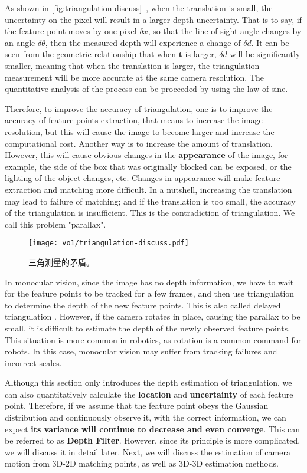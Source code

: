 As shown in \autoref{fig:triangulation-discuss}~, when the translation is small, the uncertainty on the pixel will result in a larger depth uncertainty. That is to say, if the feature point moves by one pixel $\delta x$, so that the line of sight angle changes by an angle $\delta \theta$, then the measured depth will experience a change of $\delta d$. It can be seen from the geometric relationship that when $\mathbf{t}$ is larger, $\delta d$ will be significantly smaller, meaning that when the translation is larger, the triangulation measurement will be more accurate at the same camera resolution. The quantitative analysis of the process can be proceeded by using the law of sine.

Therefore, to improve the accuracy of triangulation, one is to improve the accuracy of feature points extraction, that means to increase the image resolution, but this will cause the image to become larger and increase the computational cost. Another way is to increase the amount of translation. However, this will cause obvious changes in the \textbf{appearance} of the image, for example, the side of the box that was originally blocked can be exposed, or the lighting of the object changes, etc. Changes in appearance will make feature extraction and matching more difficult. In a nutshell, increasing the translation may lead to failure of matching; and if the translation is too small, the accuracy of the triangulation is insufficient. This is the contradiction of triangulation. We call this problem "parallax".

\begin{figure}[!ht]
	\centering
	\texttt{[image: vo1/triangulation-discuss.pdf]}
	\caption{三角测量的矛盾。}
	\label{fig:triangulation-discuss}
\end{figure}

In monocular vision, since the image has no depth information, we have to wait for the feature points to be tracked for a few frames, and then use triangulation to determine the depth of the new feature points. This is also called delayed triangulation  {\cite{Davison2003}}. However, if the camera rotates in place, causing the parallax to be small, it is difficult to estimate the depth of the newly observed feature points. This situation is more common in robotics, as rotation is a common command for robots. In this case, monocular vision may suffer from tracking failures and incorrect scales.

Although this section only introduces the depth estimation of triangulation, we can also quantitatively calculate the \textbf{location} and \textbf{uncertainty} of each feature point. Therefore, if we assume that the feature point obeys the Gaussian distribution and continuously observe it, with the correct information, we can expect \textbf{its variance will continue to decrease and even converge}. This can be referred to as \textbf{Depth Filter}. However, since its principle is more complicated, we will discuss it in detail later. Next, we will discuss the estimation of camera motion from 3D-2D matching points, as well as 3D-3D estimation methods.

